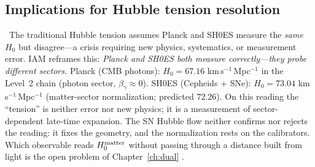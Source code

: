 \subsection{Implications for Hubble tension resolution}
\interp\ The traditional Hubble tension assumes Planck and SH0ES measure the \emph{same} $H_0$ but disagree---a crisis requiring new physics, systematics,
or measurement error. IAM reframes this: \emph{Planck and SH0ES both measure correctly---they probe different sectors.}
Planck (CMB photons): $H_0=67.16$ km\,s$^{-1}$\,Mpc$^{-1}$ in the Level~2 chain (photon sector, $\beta_\gamma\approx0$).
SH0ES (Cepheids + SNe): $H_0=73.04$ km\,s$^{-1}$\,Mpc$^{-1}$ (matter-sector normalization; predicted $72.26$).
On this reading the ``tension'' is neither error nor new physics; it is a measurement of sector-dependent late-time expansion. The SN Hubble flow neither
confirms nor rejects the reading: it fixes the geometry, and the normalization rests on the calibrators. Which observable reads $H_0^{\rm matter}$ without
passing through a distance built from light is the open problem of Chapter~\ref{ch:dual} \openprob.

